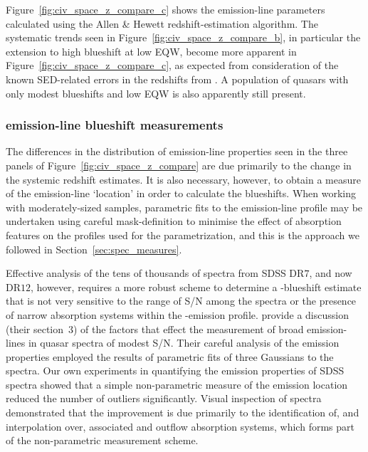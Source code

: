 Figure~\ref{fig:civ_space_z_compare_c} shows the  emission-line parameters calculated using the Allen \& Hewett redshift-estimation algorithm.  
The systematic trends seen in Figure~\ref{fig:civ_space_z_compare_b}, in particular the extension to high blueshift at low  EQW, become more apparent in Figure~\ref{fig:civ_space_z_compare_c}, as expected from consideration of the known SED-related errors in the redshifts from \citet{hewett10}.
A population of quasars with only modest blueshifts and low EQW is also apparently still present. 

\subsubsection{ emission-line blueshift measurements}
\label{sec:ch3-civmeasure}

The differences in the distribution of  emission-line properties seen in the three panels of Figure~\ref{fig:civ_space_z_compare} are due primarily to the change in the systemic redshift estimates. 
It is also necessary, however, to obtain a measure of the  emission-line `location' in order to calculate the blueshifts. 
When working with moderately-sized samples, parametric fits to the emission-line profile may be undertaken using careful mask-definition to minimise the effect of absorption features on the profiles used for the parametrization, and this is the approach we followed in Section~\ref{sec:spec_measures}.

Effective analysis of the tens of thousands of spectra from SDSS DR$7$, and now DR$12$, however, requires a more robust scheme to determine a -blueshift estimate that is not very sensitive to the range of S/N among the spectra or the presence of narrow absorption systems within the -emission profile. 
\citet{shen11} provide a discussion (their section~$3$) of the factors that effect the measurement of broad emission-lines in quasar spectra of modest S/N. 
Their careful analysis of the  emission properties employed the results of parametric fits of three Gaussians to the spectra. 
Our own experiments in quantifying the  emission properties of SDSS spectra showed that a simple non-parametric measure of the  emission location reduced the number of outliers significantly. 
Visual inspection of spectra demonstrated that the improvement is due primarily to the identification of, and interpolation over, associated and outflow absorption systems, which forms part of the non-parametric measurement scheme. 

